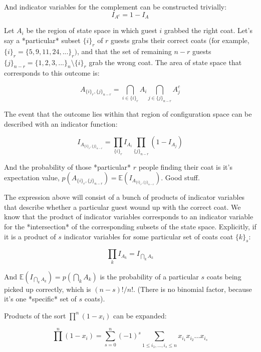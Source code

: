 And indicator variables for the complement can be constructed trivially:
\begin{equation}
I_{A^c} = 1 - I_A
\end{equation}

Let $A_i$ be the region of state space in which guest $i$ grabbed the right coat. Let's say a *particular* subset $\{i\}_r$ of $r$ guests grabs their correct coats (for example, $\{i\}_r = \{5,9,11,24,...\}_r)$, and that the set of remaining $n-r$ guests $\{j\}_{n-r}= \{1,2,3,...\}_n\setminus\{i\}_r$ grab the wrong coat. The area of state space that corresponds to this outcome is:

\begin{equation}
A_{\{i\}_r,\{j\}_{n-r}}=\bigcap_{i\in\{i\}_r}A_i\bigcap_{j\in\{j\}_{n-r}}A_j^c
\end{equation}

The event that the outcome lies within that region of configuration space can be described with an indicator function:

\begin{equation}
I_{A_{\{i\}_r,\{j\}_{n-r}}} = \prod_{\{i\}_r}I_{A_i}\prod_{\{j\}_{n-r}}(1-I_{A_j})
\end{equation}

And the probability of those *particular* $r$ people finding their coat is it's expectation value, $p(A_{\{i\}_r,\{j\}_{n-r}}) = \mathbb{E}(I_{A_{\{i\}_r,\{j\}_{n-r}}})$. Good stuff.

The expression above will consist of a bunch of products of indicator variables that describe whether a particular guest wound up with the correct coat. We know that the product of indicator variables corresponds to an indicator variable for the *intersection* of the corresponding subsets of the state space. Explicitly, if it is a product of $s$ indicator variables for some particular set of coats coat $\{k\}_s$:

\begin{equation}
\prod_{k} I_{A_k} = I_{\bigcap_{k}A_k}
\end{equation}

And $\mathbb{E}(I_{\bigcap_{k} A_k}) = p(\bigcap_{k} A_k)$ is the probability of a particular $s$ coats being picked up correctly, which is $(n-s)!/n!$. (There is no binomial factor, because it's one *specific* set of $s$ coats).

Products of the sort $\prod^n (1-x_i)$ can be expanded:

\begin{equation}
\prod^n (1-x_i) = \sum_{s=0}^n (-1)^s \sum_{1\leq i_1,...,i_s\leq n} x_{i_1}x_{i_2}...x_{i_s}
\end{equation}

